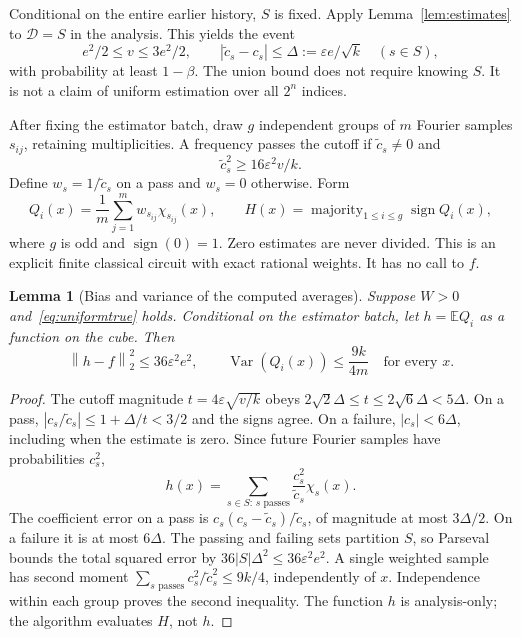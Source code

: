 \documentclass[11pt]{article}
\newtheorem{lemma}[theorem]{Lemma}
\theoremstyle{remark}\newtheorem{remark}[theorem]{Remark}
\newcommand{\E}{\mathbb E}
\newcommand{\sgn}{\operatorname{sign}}
\newcommand{\norm}[1]{\left\|#1\right\|}
\begin{document}
Conditional on the entire earlier history, $S$ is fixed. Apply Lemma~\ref{lem:estimates} to $\mathcal D=S$ in the analysis. This yields the event
\begin{equation}\label{eq:uniformtrue}
 e^2/2\le v\le3e^2/2,\qquad
 |\widetilde c_s-c_s|\le\Delta:=\varepsilon e/\sqrt k\quad(s\in S),
\end{equation}
with probability at least $1-\beta$. The union bound does not require knowing $S$. It is not a claim of uniform estimation over all $2^n$ indices.

After fixing the estimator batch, draw $g$ independent groups of $m$ Fourier samples $s_{ij}$, retaining multiplicities. A frequency passes the cutoff if $\widetilde c_s\ne0$ and
\begin{equation}\label{eq:cutoff}
 \widetilde c_s^2\ge16\varepsilon^2v/k.
\end{equation}
Define $w_s=1/\widetilde c_s$ on a pass and $w_s=0$ otherwise. Form
\begin{equation}\label{eq:H}
 Q_i(x)=\frac1m\sum_{j=1}^m w_{s_{ij}}\chi_{s_{ij}}(x),\qquad
 H(x)=\operatorname{majority}_{1\le i\le g}\sgn Q_i(x),
\end{equation}
where $g$ is odd and $\sgn(0)=1$. Zero estimates are never divided. This is an explicit finite classical circuit with exact rational weights. It has no call to $f$.

\begin{lemma}[Bias and variance of the computed averages]\label{lem:bias}
Suppose $W>0$ and~\eqref{eq:uniformtrue} holds. Conditional on the estimator batch, let $h=\E Q_i$ as a function on the cube. Then
\begin{equation}\label{eq:bias}
 \norm{h-f}_2^2\le36\varepsilon^2e^2,\qquad
 \operatorname{Var}(Q_i(x))\le\frac{9k}{4m}\quad\text{for every }x.
\end{equation}
\end{lemma}
\begin{proof}
The cutoff magnitude $t=4\varepsilon\sqrt{v/k}$ obeys
$2\sqrt2\Delta\le t\le2\sqrt6\Delta<5\Delta$.
On a pass, $|c_s/\widetilde c_s|\le1+\Delta/t<3/2$ and the signs agree. On a failure, $|c_s|<6\Delta$, including when the estimate is zero. Since future Fourier samples have probabilities $c_s^2$,
\[
 h(x)=\sum_{s\in S:\,s\text{ passes}}\frac{c_s^2}{\widetilde c_s}\chi_s(x).
\]
The coefficient error on a pass is $c_s(c_s-\widetilde c_s)/\widetilde c_s$, of magnitude at most $3\Delta/2$. On a failure it is at most $6\Delta$. The passing and failing sets partition $S$, so Parseval bounds the total squared error by $36|S|\Delta^2\le36\varepsilon^2e^2$. A single weighted sample has second moment
$\sum_{s\text{ passes}}c_s^2/\widetilde c_s^2\le9k/4$, independently of $x$. Independence within each group proves the second inequality. The function $h$ is analysis-only; the algorithm evaluates $H$, not $h$.
\end{proof}
\end{document}
